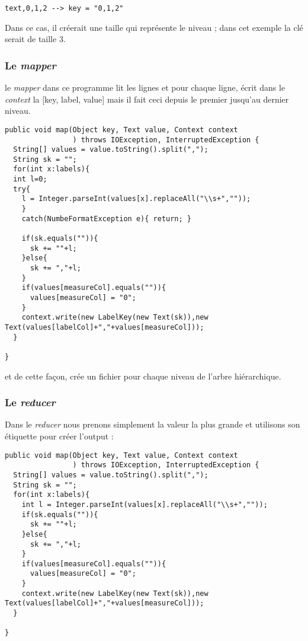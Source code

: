 \documentclass[12pt]{article}
\begin{document}
\begin{verbatim}
text,0,1,2 --> key = "0,1,2"
\end{verbatim}

Dans ce cas, il créerait une taille qui représente le niveau ; dans cet exemple la clé serait de taille 3.

\subsubsection{Le \emph{mapper}}
\label{sec:org90eeb28}

le \emph{mapper} dans ce programme lit les lignes et pour chaque ligne, écrit dans le \emph{context} la 
[key, label, value] mais il fait ceci depuis le premier jusqu'au dernier niveau. 
\newpage
\begin{verbatim}
public void map(Object key, Text value, Context context
                ) throws IOException, InterruptedException {
  String[] values = value.toString().split(",");
  String sk = "";
  for(int x:labels){
  int l=0;
  try{
    l = Integer.parseInt(values[x].replaceAll("\\s+",""));
    }
    catch(NumbeFormatException e){ return; }
    
    if(sk.equals("")){
      sk += ""+l;
    }else{
      sk += ","+l;
    }
    if(values[measureCol].equals("")){
      values[measureCol] = "0";
    }
    context.write(new LabelKey(new Text(sk)),new Text(values[labelCol]+","+values[measureCol]));
  }

}
\end{verbatim}
et de cette façon, crée un fichier pour chaque niveau de l'arbre hiérarchique.


\subsubsection{Le \emph{reducer}}
\label{sec:org3396736}
Dans le \emph{reducer} nous prenons simplement la valeur la plus grande et utilisons son 
étiquette pour créer l'output : 

\begin{verbatim}
public void map(Object key, Text value, Context context
                ) throws IOException, InterruptedException {
  String[] values = value.toString().split(",");
  String sk = "";
  for(int x:labels){
    int l = Integer.parseInt(values[x].replaceAll("\\s+",""));
    if(sk.equals("")){
      sk += ""+l;
    }else{
      sk += ","+l;
    }
    if(values[measureCol].equals("")){
      values[measureCol] = "0";
    }
    context.write(new LabelKey(new Text(sk)),new Text(values[labelCol]+","+values[measureCol]));
  }

}
\end{verbatim}
\end{document}
